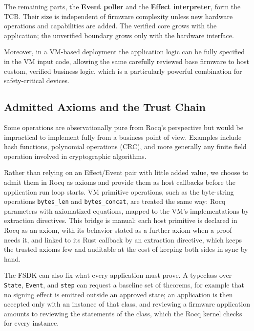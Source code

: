 \documentclass[runningheads]{llncs}
\newcommand{\code}[1]{\texttt{#1}}
\begin{document}
The remaining parts, the \textbf{Event poller} and the \textbf{Effect interpreter}, form the TCB.
Their size is independent of firmware complexity unless new hardware operations and capabilities are added.
The verified core grows with the application; the unverified boundary grows only with the hardware interface.

Moreover, in a VM-based deployment the application logic can be fully specified in the VM input code, allowing the same carefully reviewed base firmware to host custom, verified business logic, which is a particularly powerful combination for safety-critical devices.

\subsection{Admitted Axioms and the Trust Chain}
\label{sec:axioms}

Some operations are observationally pure from Rocq's perspective but would be impractical to implement fully from a business point of view.
Examples include hash functions, polynomial operations (CRC), and more generally any finite field operation involved in cryptographic algorithms.

Rather than relying on an Effect/Event pair with little added value, we choose to admit them in Rocq as axioms and provide them as host callbacks before the application run loop starts.
VM primitive operations, such as the byte-string operations \code{bytes\_len} and \code{bytes\_concat}, are treated the same way: Rocq parameters with axiomatized equations, mapped to the VM's implementations by extraction directives.
This bridge is manual: each host primitive is declared in Rocq as an axiom, with its behavior stated as a further axiom when a proof needs it, and linked to its Rust callback by an extraction directive, which keeps the trusted axioms few and auditable at the cost of keeping both sides in sync by hand.

The FSDK can also fix what every application must prove.
A typeclass over \code{State}, \code{Event}, and \code{step} can request a baseline set of theorems, for example that no signing effect is emitted outside an approved state; an application is then accepted only with an instance of that class, and reviewing a firmware application amounts to reviewing the statements of the class, which the Rocq kernel checks for every instance.
\end{document}
